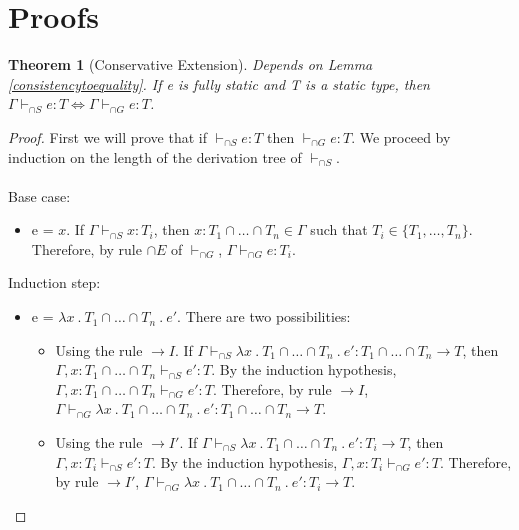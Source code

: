\documentclass[a4paper]{article}
\newtheorem{theorem}{Theorem}
\begin{document}
\newpage

\section{Proofs}
\begin{theorem}[Conservative Extension]
\label{equivalence}
Depends on Lemma \ref{consistencytoequality}.
If e is fully static and T is a static type, then $\Gamma \vdash_{\cap S} e : T \iff \Gamma \vdash_{\cap G} e : T$.
\end{theorem}
\begin{proof}
First we will prove that if $\vdash_{\cap S} e : T$ then $\vdash_{\cap G} e : T$.
We proceed by induction on the length of the derivation tree of $\vdash_{\cap S}$.\\\\
Base case:
\begin{itemize}
    \item e = $x$.
    If $\Gamma \vdash_{\cap S} x : T_i$, then $x : T_1 \cap \ldots \cap T_n \in \Gamma$ such that $T_i \in \{T_1, \ldots, T_n\}$.
    Therefore, by rule $\cap E$ of $\vdash_{\cap G}$, $\Gamma \vdash_{\cap G} e : T_i$.\\
\end{itemize}
Induction step:
\begin{itemize}
    \item e = $\lambda x\ .\ T_1 \cap \ldots \cap T_n\ .\ e'$.
    There are two possibilities:
    \begin{itemize}
        \item Using the rule ${\rightarrow} I$.
        If $\Gamma \vdash_{\cap S} \lambda x\ .\ T_1 \cap \ldots \cap T_n\ .\ e' : T_1 \cap \ldots \cap T_n \rightarrow T$, then $\Gamma, x : T_1 \cap \ldots \cap T_n \vdash_{\cap S} e' : T$.
        By the induction hypothesis, $\Gamma, x : T_1 \cap \ldots \cap T_n \vdash_{\cap G} e' : T$.
        Therefore, by rule ${\rightarrow} I$, $\Gamma \vdash_{\cap G} \lambda x\ .\ T_1 \cap \ldots \cap T_n\ .\ e' : T_1 \cap \ldots \cap T_n \rightarrow T$.
        \item Using the rule ${\rightarrow} I'$.
        If $\Gamma \vdash_{\cap S} \lambda x\ .\ T_1 \cap \ldots \cap T_n\ .\ e' : T_i \rightarrow T$, then $\Gamma, x : T_i \vdash_{\cap S} e' : T$.
        By the induction hypothesis, $\Gamma, x : T_i \vdash_{\cap G} e' : T$.
        Therefore, by rule ${\rightarrow} I'$, $\Gamma \vdash_{\cap G} \lambda x\ .\ T_1 \cap \ldots \cap T_n\ .\ e' : T_i \rightarrow T$.
    \end{itemize}

\end{itemize}
\end{proof}
\end{document}
